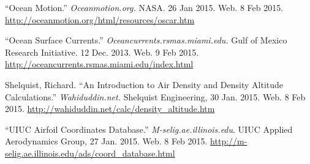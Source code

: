 \documentclass[a4paper,11pt]{article}
\begin{document}
\begin{spacing}{1.0}
\begin{thebibliography}{99}
	 ``Ocean Motion.'' {\it Oceanmotion.org.} NASA. 26 Jan 2015. Web. 8 Feb 2015. \url{http://oceanmotion.org/html/resources/oscar.htm}
	
	 ``Ocean Surface Currents.'' {\it Oceancurrents.rsmas.miami.edu.} Gulf of Mexico Research Initiative. 12 Dec. 2013. Web. 9 Feb 2015. \url{http://oceancurrents.rsmas.miami.edu/index.html}
	
	 Shelquist, Richard. ``An Introduction to Air Density and Density Altitude Calculations.'' {\it Wahiduddin.net.} Shelquist Engineering, 30 Jan. 2015. Web. 8 Feb 2015. \url{http://wahiduddin.net/calc/density_altitude.htm}
	
	 ``UIUC Airfoil Coordinates Database.'' {\it M-selig.ae.illinois.edu}. UIUC Applied Aerodynamics Group, 27 Jan. 2015. Web. 8 Feb 2015. \url{http://m-selig.ae.illinois.edu/ads/coord_database.html}
		 
\end{thebibliography}



\end{spacing}
\end{document}
